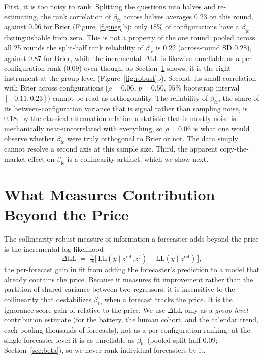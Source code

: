\documentclass[11pt]{article}
\begin{document}
First, it is too noisy to rank. Splitting the questions into halves and re-estimating, the rank correlation of $\beta_{\mathrm{fc}}$ across halves averages $0.23$ on this round, against $0.96$ for Brier (Figure~\ref{fig:neg}b); only $18\%$ of configurations have a $\beta_{\mathrm{fc}}$ distinguishable from zero. This is not a property of the one round: pooled across all 25 rounds the split-half rank reliability of $\beta_{\mathrm{fc}}$ is $0.22$ (across-round SD $0.28$), against $0.87$ for Brier, while the incremental $\Delta$LL is likewise unreliable as a per-configuration rank ($0.09$) even though, as Section~\ref{sec:dll} shows, it is the right instrument at the group level (Figure~\ref{fig:robust}b). Second, its small correlation with Brier across configurations ($\rho = 0.06$, $p = 0.50$, $95\%$ bootstrap interval $[-0.11, 0.23]$) cannot be read as orthogonality. The reliability of $\beta_{\mathrm{fc}}$, the share of its between-configuration variance that is signal rather than sampling noise, is $0.18$; by the classical attenuation relation \citep{spearman1904} a statistic that is mostly noise is mechanically near-uncorrelated with everything, so $\rho = 0.06$ is what one would observe whether $\beta_{\mathrm{fc}}$ were truly orthogonal to Brier or not. The data simply cannot resolve a second axis at this sample size. Third, the apparent copy-the-market effect on $\beta_{\mathrm{fc}}$ is a collinearity artifact, which we show next.

\section{What Measures Contribution Beyond the Price}
\label{sec:dll}
The collinearity-robust measure of information a forecaster adds beyond the price is the incremental log-likelihood
\[ \Delta\mathrm{LL} \;=\; \tfrac1N\big[\,\mathrm{LL}(y \mid z^{\mathrm{ref}}, z^{f}) - \mathrm{LL}(y \mid z^{\mathrm{ref}})\,\big], \]
the per-forecast gain in fit from adding the forecaster's prediction to a model that already contains the price. Because it measures fit improvement rather than the partition of shared variance between two regressors, it is insensitive to the collinearity that destabilizes $\beta_{\mathrm{fc}}$ when a forecast tracks the price. It is the ignorance-score gain of \citet{roulston2002} relative to the price. We use $\Delta\mathrm{LL}$ only as a \emph{group-level} contribution estimate (for the battery, the human cohort, and the calendar trend, each pooling thousands of forecasts), not as a per-configuration ranking: at the single-forecaster level it is as unreliable as $\beta_{\mathrm{fc}}$ (pooled split-half $0.09$; Section~\ref{sec:beta}), so we never rank individual forecasters by it.
\end{document}
